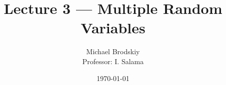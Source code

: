 


\title{Lecture 3 — Multiple Random Variables}
\date{\today}
\author{Michael Brodskiy\\ \small Professor: I. Salama}



\maketitle

